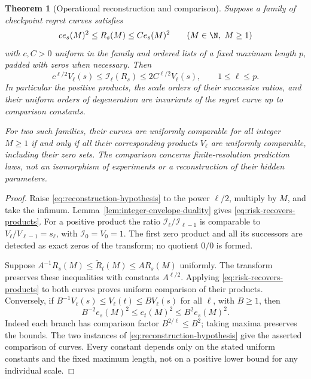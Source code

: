 \documentclass[11pt]{amsart}
\newtheorem{theorem}{Theorem}[section]
\theoremstyle{definition}\newtheorem{definition}[theorem]{Definition}
\theoremstyle{remark}\newtheorem{remark}[theorem]{Remark}
\begin{document}
\begin{theorem}[Operational reconstruction and comparison]
\label{thm:operational-reconstruction}
Suppose a family of checkpoint regret curves satisfies
\begin{equation}\label{eq:reconstruction-hypothesis}
 c e_s(M)^2\le R_s(M)\le C e_s(M)^2
 \qquad(M\in\N,\ M\ge1)
\end{equation}
with $c,C>0$ uniform in the family and ordered lists of a fixed
maximum length $p$, padded with zeros when necessary. Then
\begin{equation}\label{eq:risk-recovers-products}
 c^{\ell/2}V_\ell(s)\le\mathcal I_\ell(R_s)
             \le2C^{\ell/2}V_\ell(s),\qquad 1\le\ell\le p.
\end{equation}
In particular the positive products, the scale orders of their successive
ratios, and their uniform orders of degeneration are
invariants of the regret curve up to comparison constants.

For two such families, their curves are uniformly comparable for all
integer $M\ge1$ if and only if all their corresponding products
$V_\ell$ are uniformly comparable, including their zero sets.
The comparison concerns finite-resolution prediction laws, not an
isomorphism of experiments or a reconstruction of their hidden parameters.
\end{theorem}
\begin{proof}
Raise \eqref{eq:reconstruction-hypothesis} to the power $\ell/2$,
multiply by $M$, and take the infimum. Lemma~\ref{lem:integer-envelope-duality}
gives \eqref{eq:risk-recovers-products}. For a positive product the
ratio $\mathcal I_\ell/\mathcal I_{\ell-1}$ is comparable to
$V_\ell/V_{\ell-1}=s_\ell$, with $\mathcal I_0=V_0=1$.
The first zero product and all its successors are detected as exact
zeros of the transform; no quotient $0/0$ is formed.

Suppose $A^{-1}R_s(M)\le\widetilde R_t(M)\le A R_s(M)$ uniformly.
The transform preserves these inequalities with constants $A^{\ell/2}$.
Applying \eqref{eq:risk-recovers-products} to both curves proves uniform
comparison of their products. Conversely, if
$B^{-1}V_\ell(s)\le V_\ell(t)\le B V_\ell(s)$ for all $\ell$,
with $B\ge1$, then
\[
 B^{-2}e_s(M)^2\le e_t(M)^2\le B^2e_s(M)^2.
\]
Indeed each branch has comparison factor $B^{2/\ell}\le B^2$;
taking maxima preserves the bounds. The two instances of
\eqref{eq:reconstruction-hypothesis} give the asserted comparison of
curves. Every constant depends only on the stated uniform constants
and the fixed maximum length, not on a positive lower bound for any
individual scale.
\end{proof}
\end{document}
